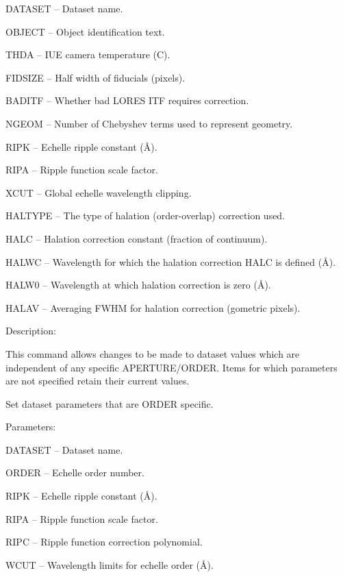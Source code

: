 \begin {description}
\begin {description}
\begin {description}
\item DATASET -- Dataset name.
\item OBJECT -- Object identification text.
\item THDA -- IUE camera temperature (C).
\item FIDSIZE -- Half width of fiducials (pixels).
\item BADITF -- Whether bad LORES ITF requires correction.
\item NGEOM -- Number of Chebyshev terms used to represent geometry.
\item RIPK -- Echelle ripple constant (\AA).
\item RIPA -- Ripple function scale factor.
\item XCUT -- Global echelle wavelength clipping.
\item HALTYPE -- The type of halation (order-overlap) correction used.
\item HALC -- Halation correction constant (fraction of continuum).
\item HALWC -- Wavelength for which the halation correction HALC is defined 
(\AA).
\item HALW0 -- Wavelength at which halation correction is zero (\AA).
\item HALAV -- Averaging FWHM for halation correction (gometric pixels).
\end {description}

\item Description:

This command allows changes to be made to dataset values which are
independent of any specific APERTURE/ORDER.
Items for which parameters are not specified retain their current
values.
\end {description}

\item [SETM]
Set dataset parameters that are ORDER specific.

\begin {description}
\item Parameters:

\begin {description}
\item DATASET -- Dataset name.
\item ORDER -- Echelle order number.
\item RIPK -- Echelle ripple constant (\AA).
\item RIPA -- Ripple function scale factor.
\item RIPC -- Ripple function correction polynomial.
\item WCUT -- Wavelength limits for echelle order (\AA).
\end {description}


\end{description}
\end{description}

